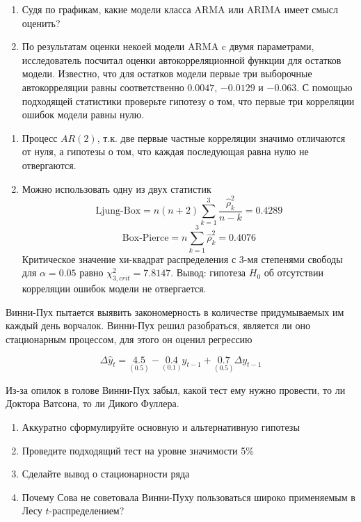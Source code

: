 \documentclass[pdftex,11pt,openany]{book}\usepackage[]{graphicx}\usepackage[]{color}
\newenvironment{knitrout}{}{} %
\begin{document}
\begin{problem}
\begin{knitrout}
\end{knitrout}



\begin{enumerate}
\item Судя по графикам, какие модели класса ARMA или ARIMA имеет смысл оценить?
\item По результатам оценки некоей модели ARMA c двумя параметрами, исследователь посчитал оценки автокорреляционной функции для остатков модели. Известно, что для остатков модели первые три выборочные автокорреляции равны соответственно $0.0047$, $-0.0129$ и $-0.063$. С помощью подходящей статистики проверьте гипотезу о том, что первые три корреляции ошибок модели равны нулю.
\end{enumerate}
\end{problem}

\begin{solution}
\begin{enumerate}
\item Процесс $AR(2)$, т.к. две первые частные корреляции значимо отличаются от нуля, а гипотезы о том, что каждая последующая равна нулю не отвергаются.
\item Можно использовать одну из двух статистик
\[
\text{Ljung-Box}=n(n+2)\sum_{k=1}^3\frac{\hat{\rho}_k^2}{n-k}=
0.4289
\]
\[
\text{Box-Pierce}=n\sum_{k=1}^3\hat{\rho}_k^2=
0.4076
\]
Критическое значение хи-квадрат распределения с 3-мя степенями свободы для $\alpha=0.05$ равно $\chi^2_{3,crit}=7.8147$.
Вывод: гипотеза $H_0$ об отсутствии корреляции ошибок модели не отвергается.
\end{enumerate}
\end{solution}





\begin{problem}
Винни-Пух пытается выявить закономерность в количестве придумываемых им каждый день ворчалок.  Винни-Пух решил разобраться, является ли оно стационарным процессом, для этого он оценил регрессию

\[ \Delta \hat{y}_t = \underset{(0.5)}{4.5} - \underset{(0.1)}{0.4}y_{t-1} +\underset{(0.5)}{0.7} \Delta y_{t-1} \]

Из-за опилок в голове Винни-Пух забыл, какой тест ему нужно провести, то ли Доктора Ватсона, то ли Дикого Фуллера. 

\begin{enumerate}
\item Аккуратно сформулируйте основную и альтернативную гипотезы
\item Проведите подходящий тест на уровне значимости 5\%
\item Сделайте вывод о стационарности ряда
\item Почему Сова не советовала Винни-Пуху пользоваться широко применяемым в Лесу $t$-распределением?
\end{enumerate}
\end{problem}
\end{document}

